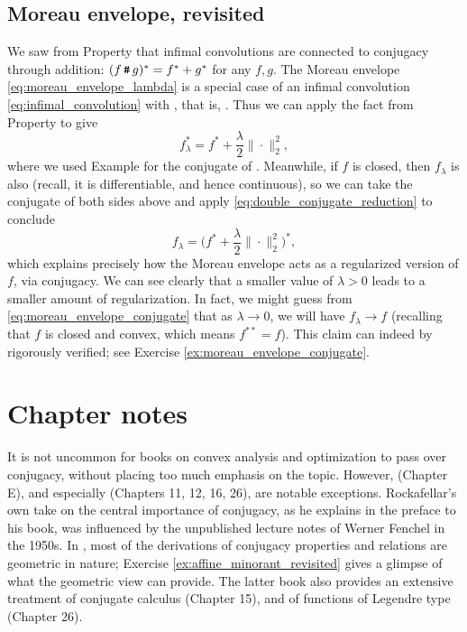 \subsection{Moreau envelope, revisited}
\label{sec:moreau_revisited}

We saw from Property  that infimal
convolutions are connected to conjugacy through addition: $(f \operatorname{\texttt{\#}} g)^* =
f^* + g^*$ for any $f,g$. The Moreau envelope \eqref{eq:moreau_envelope_lambda}
is a special case of an infimal convolution \eqref{eq:infimal_convolution} with
, that is, . Thus we can apply the fact from
Property  to give 
\[
f_\lambda^* = f^* + \frac{\lambda}{2} \|\cdot\|_2^2,
\]
where we used Example  for the conjugate of
. Meanwhile, if $f$ is closed, then
$f_\lambda$ is also (recall, it is differentiable, and hence continuous), so we
can take the conjugate of both sides above and apply
\eqref{eq:double_conjugate_reduction} to conclude   
\begin{equation}
\label{eq:moreau_envelope_conjugate}
f_\lambda = \bigg( f^* + \frac{\lambda}{2} \|\cdot\|_2^2 \bigg)^*,
\end{equation}
which explains precisely how the Moreau envelope acts as a regularized version 
of $f$, via conjugacy. We can see clearly that a smaller value of $\lambda>0$
leads to a smaller amount of regularization. In fact, we might guess from 
\eqref{eq:moreau_envelope_conjugate} that as $\lambda \to 0$, we will have  
$f_\lambda\to f$ (recalling that $f$ is closed and convex, which means $f^{**} =
f$). This claim can indeed by rigorously verified; see Exercise 
\ref{ex:moreau_envelope_conjugate}.  

\SkipTocEntry\section*{Chapter notes}

It is not uncommon for books on convex analysis and optimization to pass over
conjugacy, without placing too much emphasis on the
topic. However, \cite{hiriartUrruty2001fundamentals} (Chapter E), and
especially \cite{rockafellar1970convex} (Chapters 11, 12, 16, 26), are notable 
exceptions. Rockafellar's own take on the central importance of conjugacy, as he 
explains in the preface to his book, was influenced by the unpublished lecture
notes of Werner Fenchel in the 1950s. In \cite{rockafellar1970convex}, most of
the derivations of conjugacy properties and relations are geometric in nature; 
Exercise \ref{ex:affine_minorant_revisited} gives a glimpse of what the
geometric view can provide. The latter book also provides an extensive treatment
of conjugate calculus (Chapter 15), and of functions of Legendre type (Chapter
26). 

